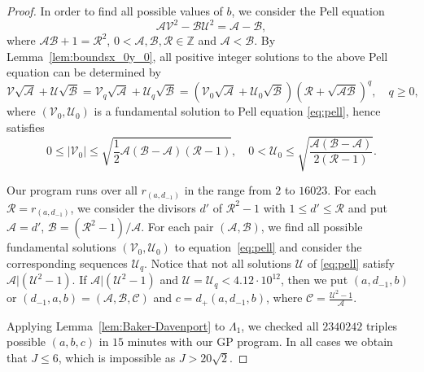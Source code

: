 \documentclass{amsart}
\theoremstyle{definition}
\def\ZZ{\mathbb Z}
\begin{document}
\begin{proof}
In order to find all possible values of $b$, we consider the Pell equation   
\begin{equation}\label{eq:pell}
\mathcal{A}\mathcal{V}^2 - \mathcal{B}\mathcal{U}^2 = \mathcal{A}-\mathcal{B}, 
\end{equation}
where $\mathcal{AB} + 1= \mathcal{R}^2$, $0<\mathcal{A,B,R}\in \ZZ$ and $\mathcal{A} < \mathcal{B}$.
By Lemma~\ref{lem:boundsx_0y_0}, all positive integer solutions to the above Pell equation can be determined by 
$$
\mathcal{V}\sqrt{\mathcal{A}} + \mathcal{U}\sqrt{\mathcal{B}}=\mathcal{V}_q\sqrt{\mathcal{A}} + \mathcal{U}_q\sqrt{\mathcal{B}} =
(\mathcal{V}_0\sqrt{\mathcal{A}}+\mathcal{U}_0\sqrt{\mathcal{B}})(\mathcal{R}+ \sqrt{\mathcal{AB}})^q, \quad q\ge 0,
$$
where $(\mathcal{V}_0,\mathcal{U}_0)$ is a fundamental solution to Pell equation \eqref{eq:pell}, hence satisfies
$$
0\le|\mathcal{V}_0|\le \sqrt{\frac{1}{2}\mathcal{A}(\mathcal{B}-\mathcal{A})(\mathcal{R}-1)},\quad 0<\mathcal{U}_0\le \sqrt{\frac{\mathcal{A}(\mathcal{B}-\mathcal{A})}{2(\mathcal{R}-1)}}.
$$

Our program runs over all $r_{(a,d_{-1})}$ in the range from $2$ to $16023$. For each $\mathcal{R}= r_{(a,d_{-1})}$,
we consider the divisors $d'$ of $ \mathcal{R}^2-1$ with $1\le d'\le \mathcal{R}$ and put $\mathcal{A}=d'$, $\mathcal{B}=(\mathcal{R}^2-1)/\mathcal{A}$.  For  each pair $(\mathcal{A},\mathcal{B})$, we find all possible fundamental solutions $(\mathcal{V}_0,\mathcal{U}_0)$ to 
equation~\eqref{eq:pell} and consider the corresponding sequences $\mathcal{U}_q$. Notice that not all solutions $\mathcal{U}$ of \eqref{eq:pell}
satisfy $\mathcal{A}|(\mathcal{U}^2-1)$. If $\mathcal{A}|(\mathcal{U}^2-1)$ and $\mathcal U= \mathcal{U}_q<4.12\cdot 10^{12}$,
then we put $(a,d_{-1},b)$ or $(d_{-1},a,b)=(\mathcal{A},\mathcal{B},\mathcal{C})$ and $c=d_{+}(a,d_{-1},b)$, where $\mathcal C=\frac{\mathcal U^2-1}{\mathcal A}$. 

Applying Lemma~\ref{lem:Baker-Davenport} 
to $\Lambda_1$, we checked all $2340242$ triples possible $(a,b,c)$ in $15$ minutes with our GP program. In all cases we obtain that $J\le6$, which is impossible as $J>20\sqrt{2}$.

\vspace{5mm}


\end{proof}
\end{document}
